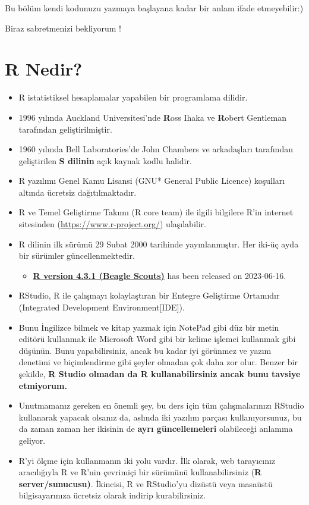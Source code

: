 \documentclass[
  oneside]{book}
\providecommand{\tightlist}{%
  \setlength{\itemsep}{0pt}\setlength{\parskip}{0pt}}
\begin{document}
\begin{info}
Bu bölüm kendi kodunuzu yazmaya başlayana kadar bir anlam ifade
etmeyebilir:)

Biraz sabretmenizi bekliyorum !
\end{info}

\hypertarget{r-nedir}{%
\section{R Nedir?}\label{r-nedir}}

\begin{itemize}
\item
  R istatistiksel hesaplamalar yapabilen bir programlama dilidir.
\item
  1996 yılında Auckland Universitesi'nde \textbf{R}oss Ihaka ve \textbf{R}obert Gentleman tarafından geliştirilmiştir.
\item
  1960 yılında Bell Laboratories'de John Chambers ve arkadaşları tarafından geliştirilen \textbf{S dilinin} açık kaynak kodlu halidir.
\item
  R yazılımı Genel Kamu Lisansi (GNU* General Public Licence) koşulları altında ücretsiz dağıtılmaktadır.
\item
  R ve Temel Geliştirme Takımı (R core team) ile ilgili bilgilere R'in internet sitesinden (\url{https://www.r-project.org/}) ulaşılabilir.
\item
  R dilinin ilk sürümü 29 Subat 2000 tarihinde yayınlanmıştır. Her iki-üç ayda bir sürümler güncellenmektedir.

  \begin{itemize}
  \tightlist
  \item
    \href{https://cran.r-project.org/src/base/R-4}{\textbf{R version 4.3.1 (Beagle Scouts)}} has been released on 2023-06-16.
  \end{itemize}
\item
  RStudio, R ile çalışmayı kolaylaştıran bir Entegre Geliştirme Ortamıdır (Integrated Development Environment{[}IDE{]}).
\item
  Bunu İngilizce bilmek ve kitap yazmak için NotePad gibi düz bir metin editörü kullanmak ile Microsoft Word gibi bir kelime işlemci kullanmak gibi düşünün. Bunu yapabilirsiniz, ancak bu kadar iyi görünmez ve yazım denetimi ve biçimlendirme gibi şeyler olmadan çok daha zor olur. Benzer bir şekilde, \textbf{R Studio olmadan da R kullanabilirsiniz ancak bunu tavsiye etmiyorum.}
\item
  Unutmamanız gereken en önemli şey, bu ders için tüm çalışmalarınızı RStudio kullanarak yapacak olsanız da, aslında iki yazılım parçası kullanıyorsunuz, bu da zaman zaman her ikisinin de \textbf{ayrı güncellemeleri} olabileceği anlamına geliyor.
\item
  R'yi ölçme için kullanmanın iki yolu vardır. İlk olarak, web tarayıcınız aracılığıyla R ve R'nin çevrimiçi bir sürümünü kullanabilirsiniz (\textbf{R server/sunucusu)}. İkincisi, R ve RStudio'yu dizüstü veya masaüstü bilgisayarınıza ücretsiz olarak indirip kurabilirsiniz.
\end{itemize}
\end{document}
